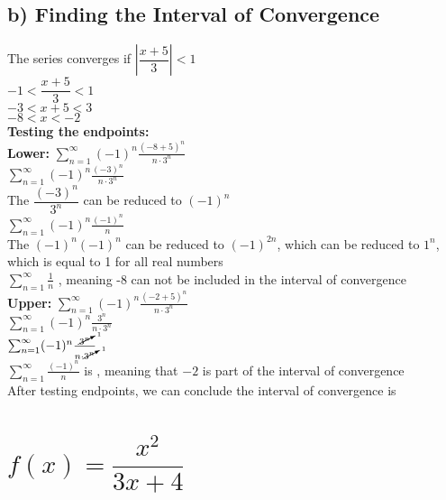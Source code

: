 \documentclass{article}
\begin{document}
\begin{multicols*}{2}
\subsection*{b) Finding the Interval of Convergence}
The series converges if $ \left|\dfrac{x+5}{3}\right|<1$
\\[0.1in]$-1< \dfrac{x+5}{3}<1$
\\[0.1in]$-3<{x+5}<3$
\\[0.1in]$-8<x<-2$
\\\textbf{Testing the endpoints:}
\\\textbf{Lower:} $ \sum_{n=1}^{\infty}  (-1)^n \frac{(-8+5)^n}{n\cdot 3^n}$
\\[0.1in]$ \sum_{n=1}^{\infty}  (-1)^n \frac{(-3)^n}{n\cdot 3^n}$
\\[0.1in]The $\dfrac{(-3)^n}{3^n}$ can be reduced to $(-1)^n$
\\[0.1in]$ \sum_{n=1}^{\infty}  (-1)^n \frac{(-1)^n}{n}$
\\[0.1in]The ${(-1)^n}{(-1)^n}$ can be reduced to $(-1)^{2n}$, which can be reduced to $1^n$, which is equal to 1 for all real numbers
\\[0.1in]$ \sum_{n=1}^{\infty}\frac{1}{n}$ , meaning -8 can not be included in the interval of convergence
\\[0.1in]\textbf{Upper:} $ \sum_{n=1}^{\infty}  (-1)^n \frac{(-2+5)^n}{n\cdot 3^n}$
\\[0.1in]$ \sum_{n=1}^{\infty}  (-1)^n \frac{3^n}{n\cdot 3^n}$
\\[0.1in]$ \sum_{n=1}^{\infty}  (-1)^n \frac{\cancelto{1}{3^n}}{n\cdot \cancelto{1}{3^n}}$
\\[0.1in]$ \sum_{n=1}^{\infty} \frac{(-1)^n}{n}$ is , meaning that $-2$ is part of the interval of convergence
\\[0.1in]After testing endpoints, we can conclude the interval of convergence is  

\end{multicols*}
\section{$ f(x)=\dfrac{x^2}{3x+4}$}
\end{document}
